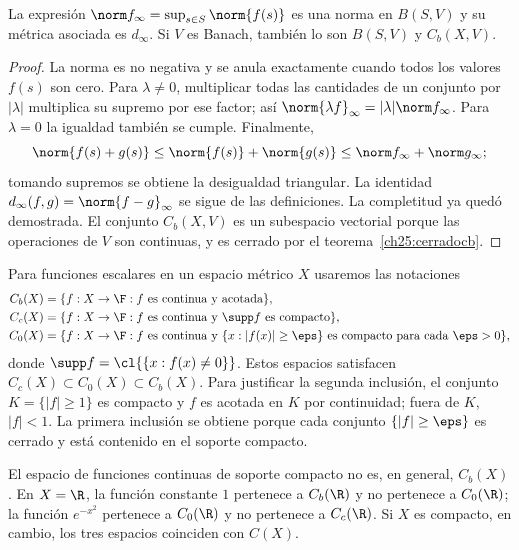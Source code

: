 \begin{proposicion}
La expresión $\norm f_\infty=\sup_{s\in S}\norm{f(s)}$ es una norma en $B(S,V)$ y su métrica asociada es $d_\infty$. Si $V$ es Banach, también lo son $B(S,V)$ y $C_b(X,V)$.
\end{proposicion}
\begin{proof}
La norma es no negativa y se anula exactamente cuando todos los valores $f(s)$ son cero. Para $\lambda\ne0$, multiplicar todas las cantidades de un conjunto por $|\lambda|$ multiplica su supremo por ese factor; así $\norm{\lambda f}_\infty=|\lambda|\norm f_\infty$. Para $\lambda=0$ la igualdad también se cumple. Finalmente,
\[
 \norm{f(s)+g(s)}\le\norm{f(s)}+\norm{g(s)}\le\norm f_\infty+\norm g_\infty;
\]
tomando supremos se obtiene la desigualdad triangular. La identidad $d_\infty(f,g)=\norm{f-g}_\infty$ se sigue de las definiciones. La completitud ya quedó demostrada. El conjunto $C_b(X,V)$ es un subespacio vectorial porque las operaciones de $V$ son continuas, y es cerrado por el teorema~\ref{ch25:cerradocb}.
\end{proof}

Para funciones escalares en un espacio métrico $X$ usaremos las notaciones
\[
 \begin{split}
 C_b(X)&=\{f:X\to\F:f\text{ es continua y acotada}\},\\
 C_c(X)&=\{f:X\to\F:f\text{ es continua y }\supp f\text{ es compacto}\},\\
 C_0(X)&=\{f:X\to\F:f\text{ es continua y }
 \{x:|f(x)|\ge\eps\}\text{ es compacto para cada }\eps>0\},
 \end{split}
\]
donde $\supp f=\cl{\{x:f(x)\ne0\}}$. Estos espacios satisfacen $C_c(X)\subset C_0(X)\subset C_b(X)$. Para justificar la segunda inclusión, el conjunto $K=\{|f|\ge1\}$ es compacto y $f$ es acotada en $K$ por continuidad; fuera de $K$, $|f|<1$. La primera inclusión se obtiene porque cada conjunto $\{|f|\ge\eps\}$ es cerrado y está contenido en el soporte compacto.

\begin{observacion}
El espacio de funciones continuas de soporte compacto no es, en general, $C_b(X)$. En $X=\R$, la función constante $1$ pertenece a $C_b(\R)$ y no pertenece a $C_0(\R)$; la función $e^{-x^2}$ pertenece a $C_0(\R)$ y no pertenece a $C_c(\R)$. Si $X$ es compacto, en cambio, los tres espacios coinciden con $C(X)$.
\end{observacion}

